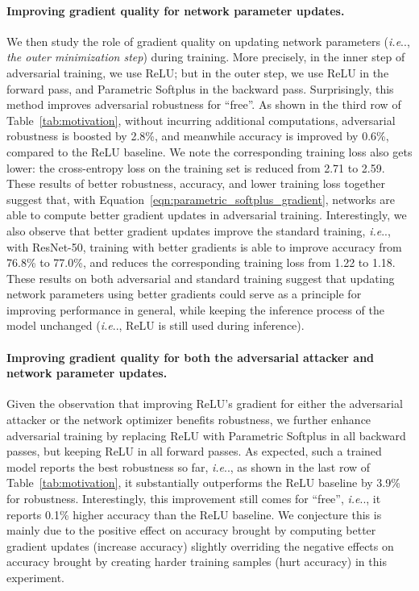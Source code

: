 \documentclass{article}
\makeatletter
\DeclareRobustCommand\onedot{\futurelet\@let@token\@onedot}
\def\@onedot{\ifx\@let@token.\else.\null\fi\xspace}
\def\ie{\emph{i.e}\onedot} \def\Ie{\emph{I.e}\onedot}
\makeatother
\begin{document}
\paragraph{Improving gradient quality for network parameter updates.} We then study the role of gradient quality on updating network parameters (\ie, \emph{the outer minimization step}) during training. More precisely, in the inner step of adversarial training, we use ReLU; but in the outer step, we use ReLU in the forward pass, and Parametric Softplus in the backward pass. Surprisingly, this method improves adversarial robustness for ``free''. As shown in the third row of Table~\ref{tab:motivation}, without incurring additional computations, adversarial robustness is boosted by 2.8\%, and meanwhile accuracy is improved by 0.6\%, compared to the ReLU baseline. We note the corresponding training loss also gets lower: the cross-entropy loss on the training set is reduced from 2.71 to 2.59. These results of better robustness, accuracy, and lower training loss together suggest that, with Equation~\eqref{eqn:parametric_softplus_gradient}, networks are able to compute better gradient updates in adversarial training. Interestingly, we also observe that better gradient updates improve the standard training, \ie, with ResNet-50, training with better gradients is able to improve accuracy from 76.8\% to 77.0\%, and reduces the corresponding training loss from 1.22 to 1.18. These results on both adversarial and standard training  suggest that updating network parameters using better gradients could serve as a principle for improving performance in general, while keeping the inference process of the model unchanged (\ie, ReLU is still used during inference). 

\paragraph{Improving gradient quality for both the adversarial attacker and network parameter updates.} Given the observation that improving ReLU's gradient for either the adversarial attacker or the network optimizer
benefits robustness, we further enhance adversarial training by replacing ReLU with Parametric Softplus in all backward passes, but keeping ReLU in all forward passes. As expected, such a trained model reports the best robustness so far, \ie, as shown in the last row of Table~\ref{tab:motivation}, it substantially outperforms the ReLU baseline by 3.9\% for robustness. Interestingly, this improvement still comes for ``free'', \ie, it reports 0.1\% higher accuracy than the ReLU baseline. We conjecture this is mainly due to the positive effect on accuracy brought by computing better gradient updates (increase accuracy) slightly overriding the negative effects on accuracy brought by creating harder training samples (hurt accuracy) in this experiment.
\end{document}
